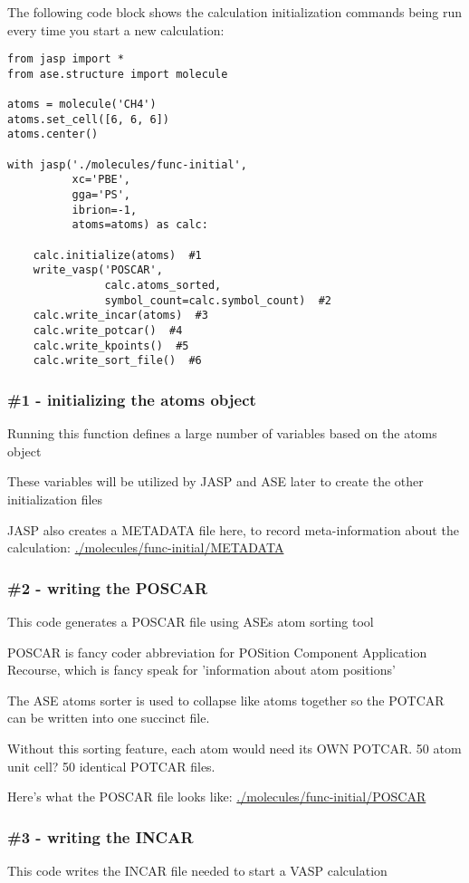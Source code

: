 \documentclass[11pt]{article}
\begin{document}
The following code block shows the calculation initialization commands being run every time you start a new calculation:

\begin{verbatim}
from jasp import *
from ase.structure import molecule

atoms = molecule('CH4')
atoms.set_cell([6, 6, 6])
atoms.center()

with jasp('./molecules/func-initial',
          xc='PBE',
          gga='PS',
          ibrion=-1,
          atoms=atoms) as calc:

    calc.initialize(atoms)  #1
    write_vasp('POSCAR',
               calc.atoms_sorted,
               symbol_count=calc.symbol_count)  #2
    calc.write_incar(atoms)  #3
    calc.write_potcar()  #4
    calc.write_kpoints()  #5
    calc.write_sort_file()  #6
\end{verbatim}

\subsubsection{\#1 - initializing the atoms object}
\label{sec-2-2-1}
Running this function defines a large number of variables based on the atoms object

These variables will be utilized by JASP and ASE later to create the other initialization files

JASP also creates a METADATA file here, to record meta-information about the calculation:
\url{./molecules/func-initial/METADATA}

\subsubsection{\#2 - writing the POSCAR}
\label{sec-2-2-2}
This code generates a POSCAR file using ASEs atom sorting tool

POSCAR is fancy coder abbreviation for POSition Component Application Recourse, which is fancy speak for 'information about atom positions'

The ASE atoms sorter is used to collapse like atoms together so the POTCAR can be written into one succinct  file.

Without this sorting feature, each atom would need its OWN POTCAR. 50 atom unit cell? 50 identical POTCAR files.

Here's what the POSCAR file looks like:
\url{./molecules/func-initial/POSCAR}

\subsubsection{\#3 - writing the INCAR}
\label{sec-2-2-3}
This code writes the INCAR file needed to start a VASP calculation
\end{document}
